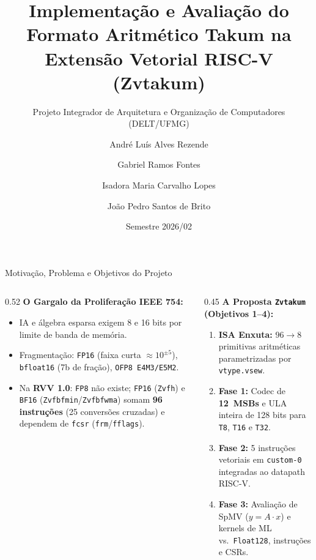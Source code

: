 \documentclass[aspectratio=169,10pt]{beamer}
\title[Takum na RVV (Zvtakum)]{Implementação e Avaliação do Formato Aritmético Takum na Extensão Vetorial RISC-V (Zvtakum)}
\subtitle{Projeto Integrador de Arquitetura e Organização de Computadores (DELT/UFMG)}
\author[Rezende, Fontes, Lopes, Brito]{André Luís Alves Rezende \and Gabriel Ramos Fontes \and Isadora Maria Carvalho Lopes \and João Pedro Santos de Brito}
\institute[DELT/UFMG]{Departamento de Engenharia Eletrônica (DELT) -- Universidade Federal de Minas Gerais}
\date[2026/02]{Semestre 2026/02}
\begin{document}
\begin{frame}
	\titlepage
\end{frame}

\begin{frame}{Motivação, Problema e Objetivos do Projeto}
	\small
	\begin{columns}[T,onlytextwidth]
		\begin{column}{0.52\textwidth}
			\textbf{O Gargalo da Proliferação IEEE 754:}
			\begin{itemize}
				\item IA e álgebra esparsa exigem 8 e 16 bits por limite de banda de memória.
				\item Fragmentação: \texttt{FP16} (faixa curta $\approx 10^{\pm 5}$), \texttt{bfloat16} (7b de fração), \texttt{OFP8 E4M3/E5M2}.
				\item Na \textbf{RVV 1.0}: \texttt{FP8} não existe; \texttt{FP16} (\texttt{Zvfh}) e \texttt{BF16} (\texttt{Zvfbfmin}/\texttt{Zvfbfwma}) somam \textbf{96 instruções} (25 conversões cruzadas) e dependem de \texttt{fcsr} (\texttt{frm}/\texttt{fflags}).
			\end{itemize}
		\end{column}
		\begin{column}{0.45\textwidth}
			\textbf{A Proposta \texttt{Zvtakum} (Objetivos 1--4):}
			\begin{enumerate}
				\item \textbf{ISA Enxuta:} $96 \to 8$ primitivas aritméticas parametrizadas por \texttt{vtype.vsew}.
				\item \textbf{Fase 1:} Codec de \textbf{12~MSBs} e ULA inteira de 128 bits para \texttt{T8}, \texttt{T16} e \texttt{T32}.
				\item \textbf{Fase 2:} 5 instruções vetoriais em \texttt{custom-0} integradas ao datapath RISC-V.
				\item \textbf{Fase 3:} Avaliação de SpMV ($y = A\cdot x$) e kernels de ML vs.\ \texttt{Float128}, instruções e CSRs.
			\end{enumerate}
		\end{column}
	\end{columns}
\end{frame}
\end{document}
